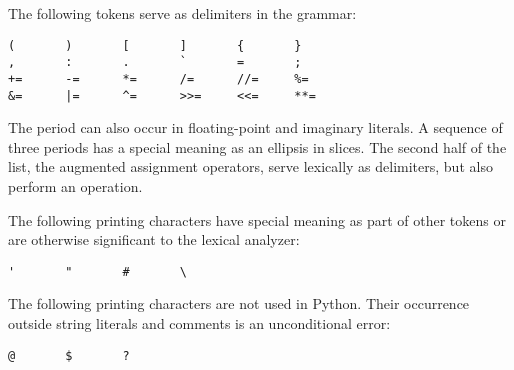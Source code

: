 The following tokens serve as delimiters in the grammar:

\begin{verbatim}
(       )       [       ]       {       }
,       :       .       `       =       ;
+=      -=      *=      /=      //=     %=
&=      |=      ^=      >>=     <<=     **=
\end{verbatim}

The period can also occur in floating-point and imaginary literals.  A
sequence of three periods has a special meaning as an ellipsis in slices.
The second half of the list, the augmented assignment operators, serve
lexically as delimiters, but also perform an operation.

The following printing \ASCII{} characters have special meaning as part
of other tokens or are otherwise significant to the lexical analyzer:

\begin{verbatim}
'       "       #       \
\end{verbatim}

The following printing \ASCII{} characters are not used in Python.  Their
occurrence outside string literals and comments is an unconditional
error:

\begin{verbatim}
@       $       ?
\end{verbatim}
